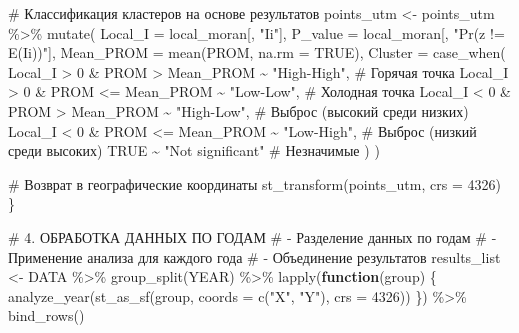 \documentclass[
  letterpaper,
  DIV=11,
  numbers=noendperiod]{scrreprt}
\newenvironment{Shaded}{\begin{snugshade}}{\end{snugshade}}
\newcommand{\AttributeTok}[1]{\textcolor[rgb]{0.40,0.45,0.13}{#1}}
\newcommand{\CommentTok}[1]{\textcolor[rgb]{0.37,0.37,0.37}{#1}}
\newcommand{\ConstantTok}[1]{\textcolor[rgb]{0.56,0.35,0.01}{#1}}
\newcommand{\ControlFlowTok}[1]{\textcolor[rgb]{0.00,0.23,0.31}{\textbf{#1}}}
\newcommand{\DecValTok}[1]{\textcolor[rgb]{0.68,0.00,0.00}{#1}}
\newcommand{\FunctionTok}[1]{\textcolor[rgb]{0.28,0.35,0.67}{#1}}
\newcommand{\NormalTok}[1]{\textcolor[rgb]{0.00,0.23,0.31}{#1}}
\newcommand{\OtherTok}[1]{\textcolor[rgb]{0.00,0.23,0.31}{#1}}
\newcommand{\SpecialCharTok}[1]{\textcolor[rgb]{0.37,0.37,0.37}{#1}}
\newcommand{\StringTok}[1]{\textcolor[rgb]{0.13,0.47,0.30}{#1}}
\begin{document}
\begin{Shaded}
\begin{Highlighting}[]
  \CommentTok{\# Классификация кластеров на основе результатов}
\NormalTok{  points\_utm }\OtherTok{\textless{}{-}}\NormalTok{ points\_utm }\SpecialCharTok{\%\textgreater{}\%}
    \FunctionTok{mutate}\NormalTok{(}
      \AttributeTok{Local\_I =}\NormalTok{ local\_moran[, }\StringTok{"Ii"}\NormalTok{],}
      \AttributeTok{P\_value =}\NormalTok{ local\_moran[, }\StringTok{"Pr(z != E(Ii))"}\NormalTok{],}
      \AttributeTok{Mean\_PROM =} \FunctionTok{mean}\NormalTok{(PROM, }\AttributeTok{na.rm =} \ConstantTok{TRUE}\NormalTok{),}
      \AttributeTok{Cluster =} \FunctionTok{case\_when}\NormalTok{(}
\NormalTok{        Local\_I }\SpecialCharTok{\textgreater{}} \DecValTok{0} \SpecialCharTok{\&}\NormalTok{ PROM }\SpecialCharTok{\textgreater{}}\NormalTok{ Mean\_PROM }\SpecialCharTok{\textasciitilde{}} \StringTok{"High{-}High"}\NormalTok{,     }\CommentTok{\# Горячая точка}
\NormalTok{        Local\_I }\SpecialCharTok{\textgreater{}} \DecValTok{0} \SpecialCharTok{\&}\NormalTok{ PROM }\SpecialCharTok{\textless{}=}\NormalTok{ Mean\_PROM }\SpecialCharTok{\textasciitilde{}} \StringTok{"Low{-}Low"}\NormalTok{,      }\CommentTok{\# Холодная точка}
\NormalTok{        Local\_I }\SpecialCharTok{\textless{}} \DecValTok{0} \SpecialCharTok{\&}\NormalTok{ PROM }\SpecialCharTok{\textgreater{}}\NormalTok{ Mean\_PROM }\SpecialCharTok{\textasciitilde{}} \StringTok{"High{-}Low"}\NormalTok{,      }\CommentTok{\# Выброс (высокий среди низких)}
\NormalTok{        Local\_I }\SpecialCharTok{\textless{}} \DecValTok{0} \SpecialCharTok{\&}\NormalTok{ PROM }\SpecialCharTok{\textless{}=}\NormalTok{ Mean\_PROM }\SpecialCharTok{\textasciitilde{}} \StringTok{"Low{-}High"}\NormalTok{,     }\CommentTok{\# Выброс (низкий среди высоких)}
        \ConstantTok{TRUE} \SpecialCharTok{\textasciitilde{}} \StringTok{"Not significant"}                          \CommentTok{\# Незначимые}
\NormalTok{      )}
\NormalTok{    )}
  
  \CommentTok{\# Возврат в географические координаты}
  \FunctionTok{st\_transform}\NormalTok{(points\_utm, }\AttributeTok{crs =} \DecValTok{4326}\NormalTok{)}
\NormalTok{\}}

\CommentTok{\# 4. ОБРАБОТКА ДАННЫХ ПО ГОДАМ}
\CommentTok{\# {-} Разделение данных по годам}
\CommentTok{\# {-} Применение анализа для каждого года}
\CommentTok{\# {-} Объединение результатов}
\NormalTok{results\_list }\OtherTok{\textless{}{-}}\NormalTok{ DATA }\SpecialCharTok{\%\textgreater{}\%}
  \FunctionTok{group\_split}\NormalTok{(YEAR) }\SpecialCharTok{\%\textgreater{}\%} 
  \FunctionTok{lapply}\NormalTok{(}\ControlFlowTok{function}\NormalTok{(group) \{}
    \FunctionTok{analyze\_year}\NormalTok{(}\FunctionTok{st\_as\_sf}\NormalTok{(group, }\AttributeTok{coords =} \FunctionTok{c}\NormalTok{(}\StringTok{"X"}\NormalTok{, }\StringTok{"Y"}\NormalTok{), }\AttributeTok{crs =} \DecValTok{4326}\NormalTok{))}
\NormalTok{  \}) }\SpecialCharTok{\%\textgreater{}\%}
  \FunctionTok{bind\_rows}\NormalTok{()}


\end{Highlighting}
\end{Shaded}
\end{document}
